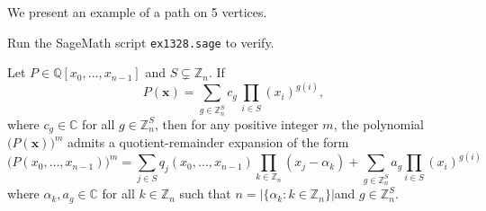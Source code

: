 \begin{example} We present an example of a path on 5 vertices.
\ \\
\begin{center}   
\end{center}
Run the SageMath script \texttt{ex1328.sage} to verify.
\end{example}

\begin{lemma} \label{lem:variable-dependency}
Let $P\in\mathbb{Q}\left[x_{0},\ldots,x_{n-1}\right]$
and $S\subsetneq\mathbb{Z}_{n}$. If 
\begin{equation}
P(\mathbf{x})=\sum_{g\in\mathbb{Z}_{n}^{S}}c_{g}\,\prod_{i\in S}(x_{i})^{g(i)},
\end{equation}
where $c_g \in\mathbb{C}$ for all $g\in\mathbb{Z}_{n}^{S}$, then for any positive integer $m$, the polynomial $\big(P(\mathbf{x})\big)^{m}$
admits a quotient-remainder expansion of the form
\begin{equation}
\big(P(x_0,\ldots,x_{n-1})\big)^{m}=\sum_{j\in S}q_{j}(x_0,\ldots,x_{n-1})\prod_{k\in\mathbb{Z}_{n}}(x_{j}-\alpha_{k})+\sum_{g\in\mathbb{Z}_{n}^{S}}a_{g}\prod_{i\in S}(x_{i})^{g(i)}
\end{equation}
where $\alpha_k, a_g\in \mathbb{C}$ for all $k\in \mathbb{Z}_n$ such that $n=\left|\big\{\alpha_{k}:k\in\mathbb{Z}_{n}\big\}\right|$and $g\in\mathbb{Z}_{n}^{S}$.
\end{lemma}

